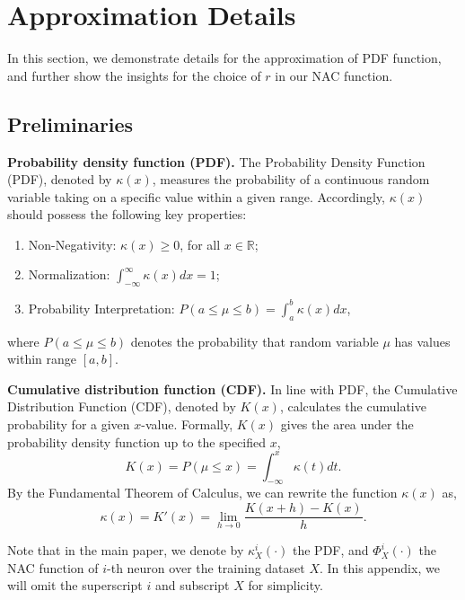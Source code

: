 \documentclass{article} \usepackage{iclr2024_conference,times}
\newcommand{\bfstart}[1]{\noindent\textbf{#1.}}
\begin{document}
\section{Approximation Details}
\label{Appendix:Approximation_Details}
In this section, we demonstrate details for the approximation of PDF function, and further show the insights for the choice of $r$ in our NAC function.

\subsection{Preliminaries} 
\bfstart{Probability density function (PDF)} The Probability Density Function (PDF), denoted by $\kappa(x)$, measures the probability of a continuous random variable taking on a specific value within a given range. Accordingly, $\kappa(x)$ should possess the following key properties: 
\begin{enumerate}[label=(\arabic*),topsep=1pt,parsep=1pt,itemindent=0.5em]
	\item {Non-Negativity}: $\kappa(x) \geq 0$, for all $x \in \mathbb{R}$; 
	\item {Normalization}: $\int_{-\infty}^{\infty} \kappa(x) dx =1$; 
	\item {Probability Interpretation}: $P(a\leq \mu \leq b) = \int_{a}^{b} \kappa(x) dx$, 
\end{enumerate}
where $P(a\leq \mu \leq b)$ denotes the probability that random variable $\mu$ has values within range $[a,b]$. 


\bfstart{Cumulative distribution function (CDF)} In line with PDF, the Cumulative Distribution Function (CDF), denoted by $K(x)$, calculates the cumulative probability for a given $x$-value. Formally, $K(x)$ gives the area under the probability density function up to the specified $x$, 
\begin{equation}
	{K}(x) = P(\mu \leq x) = \int_{-\infty}^{x} \kappa(t) dt.
\end{equation}
By the Fundamental Theorem of Calculus, we can rewrite the function $\kappa(x)$ as,
\begin{equation}
	\kappa(x) = K'(x) = \lim_{h \to 0} \frac{{K}(x+h) - {K}(x)}{h}.
\end{equation}


Note that in the main paper, we denote by $\kappa_X^i(\cdot)$ the PDF, and $\Phi_X^i(\cdot)$ the NAC function of $i$-th neuron over the training dataset $X$. In this appendix, we will omit the superscript $i$ and subscript $X$ for simplicity.
\end{document}
